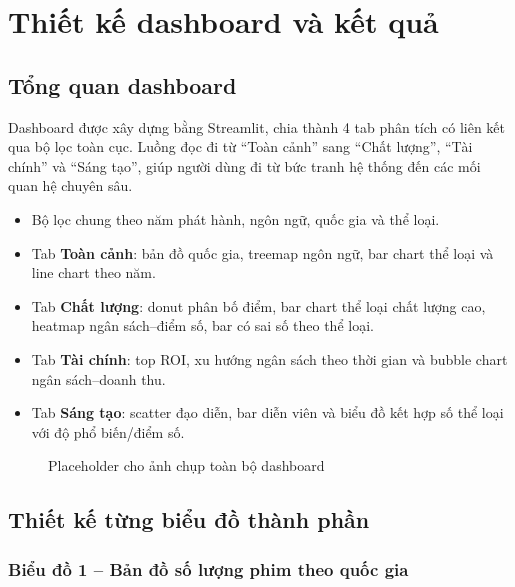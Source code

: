 \section{Thiết kế dashboard và kết quả}

\subsection{Tổng quan dashboard}
Dashboard được xây dựng bằng Streamlit, chia thành 4 tab phân tích có liên kết qua bộ lọc toàn cục. Luồng đọc đi từ ``Toàn cảnh'' sang ``Chất lượng'', ``Tài chính'' và ``Sáng tạo'', giúp người dùng đi từ bức tranh hệ thống đến các mối quan hệ chuyên sâu.
\begin{itemize}[leftmargin=2em]
    \item Bộ lọc chung theo năm phát hành, ngôn ngữ, quốc gia và thể loại.
    \item Tab \textbf{Toàn cảnh}: bản đồ quốc gia, treemap ngôn ngữ, bar chart thể loại và line chart theo năm.
    \item Tab \textbf{Chất lượng}: donut phân bố điểm, bar chart thể loại chất lượng cao, heatmap ngân sách--điểm số, bar có sai số theo thể loại.
    \item Tab \textbf{Tài chính}: top ROI, xu hướng ngân sách theo thời gian và bubble chart ngân sách--doanh thu.
    \item Tab \textbf{Sáng tạo}: scatter đạo diễn, bar diễn viên và biểu đồ kết hợp số thể loại với độ phổ biến/điểm số.
\end{itemize}

\begin{figure}[H]
    \centering
    \caption{Placeholder cho ảnh chụp toàn bộ dashboard}
\end{figure}

\subsection{Thiết kế từng biểu đồ thành phần}

\subsubsection*{Biểu đồ 1 -- Bản đồ số lượng phim theo quốc gia}

